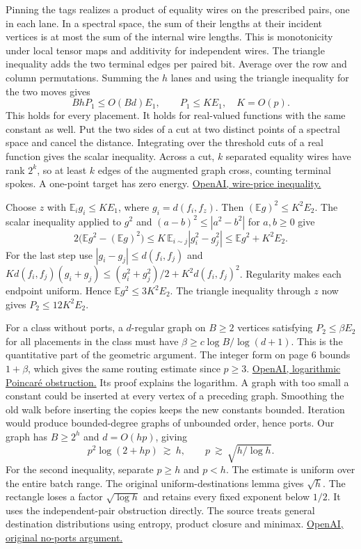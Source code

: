 \documentclass[11pt,letterpaper]{article}
\newcommand{\subhead}[1]{\par\smallskip{\noindent\large\bfseries #1\par}\vspace{-2pt}}
\newcommand{\E}{\mathbb E}
\newcommand{\paperpath}{https://github.com/openai/math/blob/3344da59991ed94f9ba711217b29c1d760badfa6/preprints}
\newcommand{\matrixref}[2]{\href{\paperpath/The-matrix-multiplication-exponent-is-nine-fourths-November-24-2026/build/#1}{#2}}
\newcommand{\permref}[2]{\href{\paperpath/Circuit-lower-bounds-for-Hamiltonian-cycle-and-the-permanent-November-24-2026/build/#1}{#2}}
\begin{document}
Pinning the tags realizes a product of equality wires on the prescribed
pairs, one in each lane. In a spectral space, the sum of their lengths
at their incident vertices is at most the sum of the internal wire lengths.
This is monotonicity under local tensor maps and additivity for independent
wires. The triangle inequality adds the two terminal edges per paired bit.
Average over the
row and column permutations. Summing the \(h\) lanes and using the triangle
inequality for the two moves gives
\[
             Bh P_1\le O(Bd) E_1,\qquad P_1\le K E_1,\quad K=O(p).
\]
This holds for every placement. It holds for real-valued functions with the
same constant as well. Put the two sides of a cut at two distinct points
of a spectral space and cancel the distance. Integrating over the threshold
cuts of a real function gives the scalar inequality. Across a cut, \(k\)
separated equality wires have rank \(2^k\), so at least \(k\) edges of the
augmented graph cross, counting terminal spokes. A one-point target has zero energy.
\matrixref{list.tex\#L60-L79}{OpenAI, wire-price inequality.}

\subhead{A first moment suffices}
Choose \(z\) with \(\E_i g_i\le K E_1\), where \(g_i=d(f_i,f_z)\).
Then \((\E g)^2\le K^2 E_2\). The scalar inequality applied to \(g^2\)
and \((a-b)^2\le|a^2-b^2|\) for \(a,b\ge0\) give
\[
 2\bigl(\E g^2-(\E g)^2\bigr)
 \le K\,\E_{i\sim j}|g_i^2-g_j^2|
 \le \E g^2+K^2 E_2 .
\]
For the last step use \(|g_i-g_j|\le d(f_i,f_j)\) and
\(K d(f_i,f_j)(g_i+g_j)\le (g_i^2+g_j^2)/2+K^2 d(f_i,f_j)^2\).
Regularity makes each endpoint uniform. Hence \(\E g^2\le3K^2 E_2\).
The triangle inequality through \(z\) now gives \(P_2\le12K^2 E_2\).

\subhead{Apply the logarithmic obstruction}
For a class without ports, a \(d\)-regular graph on \(B\ge2\) vertices
satisfying \(P_2\le\beta E_2\) for all placements in the class must have
\(\beta\ge c\log B/\log(d+1)\). This is the quantitative part of the
geometric argument. The integer form on page 6 bounds \(1+\beta\),
which gives the same routing estimate since \(p\ge3\).
\permref{entropy.tex\#L54-L64}{OpenAI, logarithmic Poincar\'e obstruction.}
Its proof explains the logarithm. A graph with too small a constant could
be inserted at every vertex of a preceding graph. Smoothing the old walk
before inserting the copies keeps the new constants bounded. Iteration would
produce bounded-degree graphs of unbounded order, hence ports.
Our graph has \(B\ge 2^h\) and \(d=O(hp)\), giving
\[
            p^2\log(2+hp)\ \gtrsim\ h,\qquad
            p\ \gtrsim\ \sqrt{h/\log h}.
\]
For the second inequality, separate \(p\ge h\) and \(p<h\). The estimate is
uniform over the entire batch range. The original uniform-destinations lemma
gives \(\sqrt h\). The rectangle loses a factor \(\sqrt{\log h}\) and retains
every fixed exponent below \(1/2\). It uses the independent-pair obstruction
directly. The source treats general destination distributions using entropy,
product closure and minimax. \matrixref{list.tex\#L45-L126}{OpenAI, original no-ports argument.}
\end{document}
